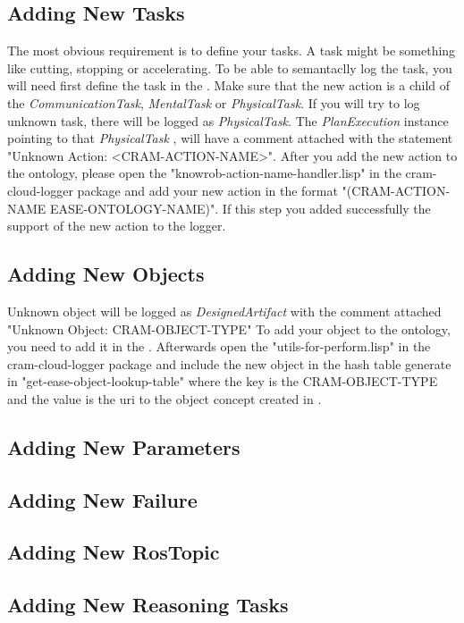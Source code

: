 \subsection{Adding New Tasks}
The most obvious requirement is to define your tasks.
A task might be something like cutting, stopping or accelerating.
To be able to semantaclly log the task, you will need first define the task in the \easeAct.
Make sure that the new action is a child of the \textit{CommunicationTask}, \textit{MentalTask} or \textit{PhysicalTask}.
If you will try to log unknown task, there will be logged as \textit{PhysicalTask}.
The \textit{PlanExecution} instance pointing to that \textit{PhysicalTask} , will have a comment attached with the statement "Unknown Action: <CRAM-ACTION-NAME>".
After you add the new action to the ontology, please open the "knowrob-action-name-handler.lisp" in the cram-cloud-logger package and add your new action in the format "(CRAM-ACTION-NAME EASE-ONTOLOGY-NAME)".
If this step you added successfully the support of the new action to the logger.

\subsection{Adding New Objects}
Unknown object will be logged as \textit{DesignedArtifact} with the comment attached "Unknown Object: CRAM-OBJECT-TYPE"
To add your object to the ontology, you need to add it in the \easeObj.
Afterwards open the "utils-for-perform.lisp" in the 
cram-cloud-logger package and include the new object in the hash table generate in "get-ease-object-lookup-table" where the key is the CRAM-OBJECT-TYPE and the value is the uri to the object concept created in \easeObj.
\subsection{Adding New Parameters}
\subsection{Adding New Failure}
\subsection{Adding New RosTopic}

\subsection{Adding New Reasoning Tasks}

